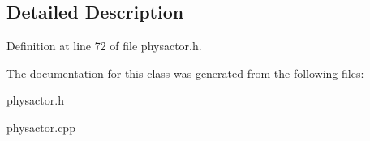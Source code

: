 \subsection{Detailed Description}


Definition at line 72 of file physactor.h.

The documentation for this class was generated from the following files:\begin{DoxyCompactItemize}
\item 
physactor.h\item 
physactor.cpp\end{DoxyCompactItemize}

